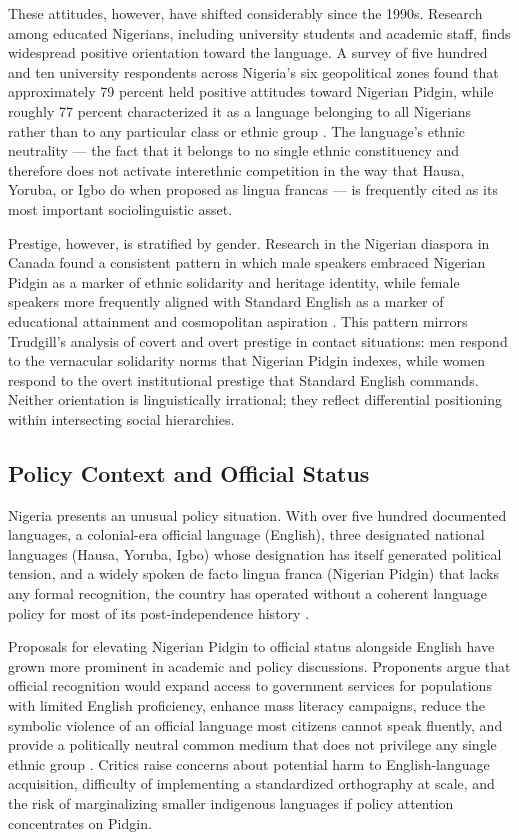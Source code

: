 \documentclass[12pt]{article}
\begin{document}
These attitudes, however, have shifted considerably since the 1990s. Research among educated Nigerians, including university students and academic staff, finds widespread positive orientation toward the language. A survey of five hundred and ten university respondents across Nigeria's six geopolitical zones found that approximately 79 percent held positive attitudes toward Nigerian Pidgin, while roughly 77 percent characterized it as a language belonging to all Nigerians rather than to any particular class or ethnic group \cite{AjaKilani2024}. The language's ethnic neutrality --- the fact that it belongs to no single ethnic constituency and therefore does not activate interethnic competition in the way that Hausa, Yoruba, or Igbo do when proposed as lingua francas --- is frequently cited as its most important sociolinguistic asset.

Prestige, however, is stratified by gender. Research in the Nigerian diaspora in Canada found a consistent pattern in which male speakers embraced Nigerian Pidgin as a marker of ethnic solidarity and heritage identity, while female speakers more frequently aligned with Standard English as a marker of educational attainment and cosmopolitan aspiration \cite{Affia2023}. This pattern mirrors Trudgill's analysis of covert and overt prestige in contact situations: men respond to the vernacular solidarity norms that Nigerian Pidgin indexes, while women respond to the overt institutional prestige that Standard English commands. Neither orientation is linguistically irrational; they reflect differential positioning within intersecting social hierarchies.

\subsection{Policy Context and Official Status}

Nigeria presents an unusual policy situation. With over five hundred documented languages, a colonial-era official language (English), three designated national languages (Hausa, Yoruba, Igbo) whose designation has itself generated political tension, and a widely spoken de facto lingua franca (Nigerian Pidgin) that lacks any formal recognition, the country has operated without a coherent language policy for most of its post-independence history \cite{OjoKilani2020}.

Proposals for elevating Nigerian Pidgin to official status alongside English have grown more prominent in academic and policy discussions. Proponents argue that official recognition would expand access to government services for populations with limited English proficiency, enhance mass literacy campaigns, reduce the symbolic violence of an official language most citizens cannot speak fluently, and provide a politically neutral common medium that does not privilege any single ethnic group \cite{Ehondor2020}. Critics raise concerns about potential harm to English-language acquisition, difficulty of implementing a standardized orthography at scale, and the risk of marginalizing smaller indigenous languages if policy attention concentrates on Pidgin.
\end{document}
